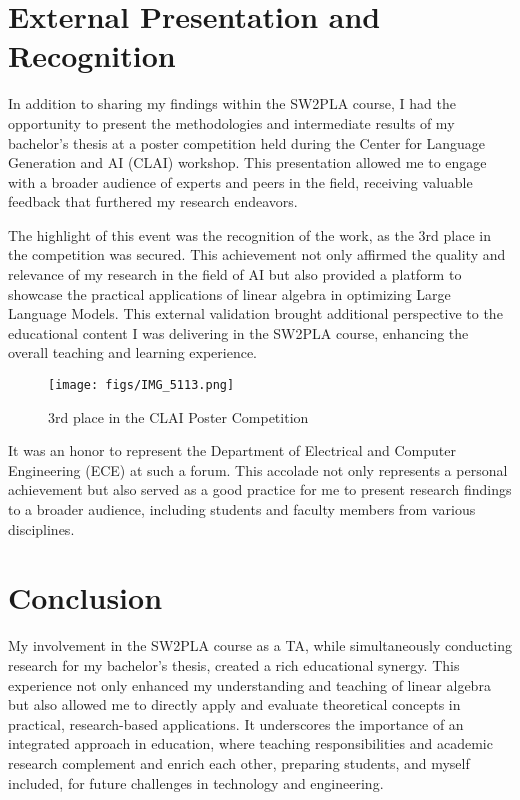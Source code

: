 \section*{External Presentation and Recognition}

In addition to sharing my findings within the SW2PLA course, I had the opportunity to present the methodologies and intermediate results of my bachelor's thesis at a poster competition held during the Center for Language Generation and AI (CLAI) workshop. This presentation allowed me to engage with a broader audience of experts and peers in the field, receiving valuable feedback that furthered my research endeavors.

The highlight of this event was the recognition of the work, as the 3rd place in the competition was secured. This achievement not only affirmed the quality and relevance of my research in the field of AI but also provided a platform to showcase the practical applications of linear algebra in optimizing Large Language Models. This external validation brought additional perspective to the educational content I was delivering in the SW2PLA course, enhancing the overall teaching and learning experience.
\begin{figure}[H]
    \centering
    \texttt{[image: figs/IMG\_5113.png]}
    \caption{3rd place in the CLAI Poster Competition}
    \label{fig:CLAI_Poster_Competition}
\end{figure}

It was an honor to represent the Department of Electrical and Computer Engineering (ECE) at such a forum. This accolade not only represents a personal achievement but also served as a good practice for me to present research findings to a broader audience, including students and faculty members from various disciplines.

\section*{Conclusion}

My involvement in the SW2PLA course as a TA, while simultaneously conducting research for my bachelor's thesis, created a rich educational synergy. This experience not only enhanced my understanding and teaching of linear algebra but also allowed me to directly apply and evaluate theoretical concepts in practical, research-based applications. It underscores the importance of an integrated approach in education, where teaching responsibilities and academic research complement and enrich each other, preparing students, and myself included, for future challenges in technology and engineering.